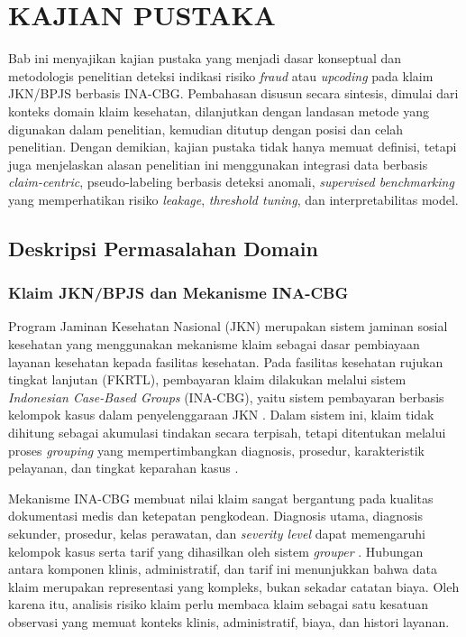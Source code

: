 \chapter{KAJIAN PUSTAKA}

Bab ini menyajikan kajian pustaka yang menjadi dasar konseptual dan metodologis penelitian deteksi indikasi risiko \emph{fraud} atau \emph{upcoding} pada klaim JKN/BPJS berbasis INA-CBG. Pembahasan disusun secara sintesis, dimulai dari konteks domain klaim kesehatan, dilanjutkan dengan landasan metode yang digunakan dalam penelitian, kemudian ditutup dengan posisi dan celah penelitian. Dengan demikian, kajian pustaka tidak hanya memuat definisi, tetapi juga menjelaskan alasan penelitian ini menggunakan integrasi data berbasis \emph{claim-centric}, pseudo-labeling berbasis deteksi anomali, \emph{supervised benchmarking} yang memperhatikan risiko \emph{leakage}, \emph{threshold tuning}, dan interpretabilitas model.

\section{Deskripsi Permasalahan Domain}\label{deskripsi-permasalahan-domain}

\subsection{Klaim JKN/BPJS dan Mekanisme INA-CBG}\label{klaim-jknbpjs-dan-mekanisme-ina-cbg}

Program Jaminan Kesehatan Nasional (JKN) merupakan sistem jaminan sosial kesehatan yang menggunakan mekanisme klaim sebagai dasar pembiayaan layanan kesehatan kepada fasilitas kesehatan. Pada fasilitas kesehatan rujukan tingkat lanjutan (FKRTL), pembayaran klaim dilakukan melalui sistem \emph{Indonesian Case-Based Groups} (INA-CBG), yaitu sistem pembayaran berbasis kelompok kasus dalam penyelenggaraan JKN \citep{kemenkes2014}. Dalam sistem ini, klaim tidak dihitung sebagai akumulasi tindakan secara terpisah, tetapi ditentukan melalui proses \emph{grouping} yang mempertimbangkan diagnosis, prosedur, karakteristik pelayanan, dan tingkat keparahan kasus \citep{kemenkes2016}.

Mekanisme INA-CBG membuat nilai klaim sangat bergantung pada kualitas dokumentasi medis dan ketepatan pengkodean. Diagnosis utama, diagnosis sekunder, prosedur, kelas perawatan, dan \emph{severity level} dapat memengaruhi kelompok kasus serta tarif yang dihasilkan oleh sistem \emph{grouper} \citep{kemenkes2016}. Hubungan antara komponen klinis, administratif, dan tarif ini menunjukkan bahwa data klaim merupakan representasi yang kompleks, bukan sekadar catatan biaya. Oleh karena itu, analisis risiko klaim perlu membaca klaim sebagai satu kesatuan observasi yang memuat konteks klinis, administratif, biaya, dan histori layanan.

